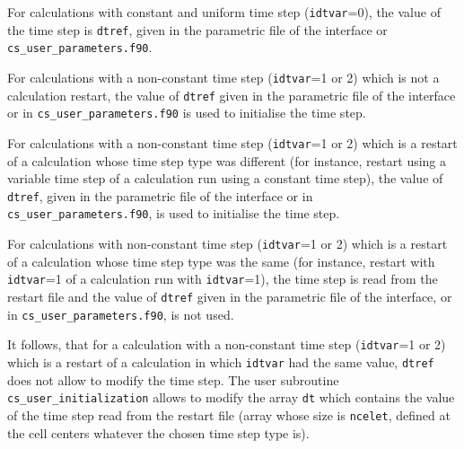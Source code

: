 {{{
\begin{list}{-}{}
\item For calculations with constant and uniform time step
      (\texttt{idtvar}=0), the value of the time step is \texttt{dtref},
      given in the parametric file of the interface or \texttt{cs\_user\_parameters.f90}.
\item For calculations with a non-constant time step
      (\texttt{idtvar}=1 or 2) which is not a calculation restart,
      the value of \texttt{dtref} given in the parametric file of the interface
      or in \texttt{cs\_user\_parameters.f90} is used to initialise the time step.
\item For calculations with a non-constant time step
      (\texttt{idtvar}=1 or 2) which is a restart of a
      calculation whose time step type was different (for instance, restart
      using a variable time step of a calculation run using a constant time
      step), the value of \texttt{dtref}, given in the parametric file of the
      interface or in \texttt{cs\_user\_parameters.f90}, is used to initialise the time step.
\item For calculations with non-constant time step
      (\texttt{idtvar}=1 or 2) which is a restart of a
      calculation whose time step type was the same (for instance, restart with
      \texttt{idtvar}=1 of a calculation run with \texttt{idtvar}=1), the time
      step is read from the restart file and the value of \texttt{dtref} given
      in the parametric file of the interface, or in \texttt{cs\_user\_parameters.f90}, is not used.
\end{list}
It follows, that for a calculation with a non-constant time step (\texttt{idtvar}=1
or 2) which is a restart of a calculation in which
\texttt{idtvar} had the same value, \texttt{dtref} does not allow to modify the
time step. The user subroutine \texttt{cs\_user\_initialization} allows to modify the array
\texttt{dt} which contains the value of the time step read from the restart file
(array whose size is \texttt{ncelet}, defined at the cell centers whatever the
chosen time step type is).

}}}
